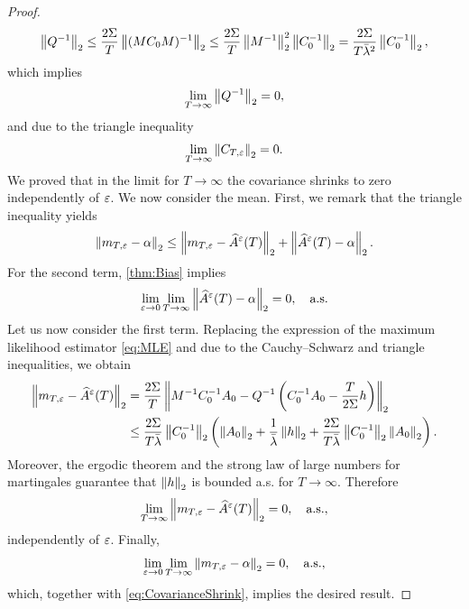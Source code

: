 \documentclass[review,onefignum,onetabnum]{siamonline190516}
\begin{document}
\begin{proof}
\begin{equation}
		\left\|Q^{-1}\right\|_2 \leq \frac{2\Sigma}T \left\|(MC_0M)^{-1}\right\|_2 \leq \frac{2\Sigma}T \left\|M^{-1}\right\|_2^2 \left\|C_0^{-1}\right\|_2 = \frac{2\Sigma}{T\bar \lambda^2} \left\|C_0^{-1}\right\|_2,
	\end{equation}
	which implies
	\begin{equation}
		\lim_{T \to \infty}\left\|Q^{-1}\right\|_2 = 0,
	\end{equation}
	and due to the triangle inequality
	\begin{equation}\label{eq:CovarianceShrink}
		\lim_{T \to \infty}\norm{C_{T,\epl}}_2 = 0.
	\end{equation}
	We proved that in the limit for $T \to \infty$ the covariance shrinks to zero independently of $\varepsilon$. We now consider the mean. First, we remark that the triangle inequality yields
	\begin{equation}
		\left\|m_{T,\varepsilon} - \alpha\right\|_2 \leq \left\|m_{T,\varepsilon} - \widehat A^\varepsilon(T)\right\|_2 + \left\|\widehat A^\varepsilon(T) - \alpha\right\|_2.
	\end{equation}
	For the second term, \cref{thm:Bias} implies 
	\begin{equation}
		\lim_{\varepsilon \to 0} \lim_{T \to \infty}\left\|\widehat A^\varepsilon(T) - \alpha\right\|_2 = 0, \quad \text{a.s.}
	\end{equation}
	Let us now consider the first term.	Replacing the expression of the maximum likelihood estimator \eqref{eq:MLE} and due to the Cauchy--Schwarz and triangle inequalities, we obtain
	\begin{equation}
	\begin{aligned}
		\left\|m_{T,\varepsilon} - \widehat A^\varepsilon(T)\right\|_2 &= \frac{2\Sigma}T\left\|M^{-1}C_0^{-1}A_0 - Q^{-1}\left(C_0^{-1}A_0 - \frac{T}{2\Sigma} h \right)\right\|_2\\
		&\leq \frac{2\Sigma}{T\bar \lambda} \left\|C_0^{-1}\right\|_2 \left(\left\|A_0\right\|_2 + \frac1{\bar \lambda}\left\|h\right\|_2 + \frac{2\Sigma}{T\bar \lambda} \left\|C_0^{-1}\right\|_2\left\|A_0\right\|_2\right).
	\end{aligned}
	\end{equation}
	Moreover, the ergodic theorem and the strong law of large numbers for martingales guarantee that $\left\|h\right\|_2$ is bounded a.s. for $T \to \infty$. Therefore
	\begin{equation}
	\lim_{T\to\infty} \left\|m_{T,\varepsilon} - \widehat A^\varepsilon(T)\right\|_2 = 0, \quad \text{a.s.},
	\end{equation}
	independently of $\varepsilon$. Finally, 
	\begin{equation}
		\lim_{\varepsilon \to 0} \lim_{T \to \infty}\left\|m_{T,\varepsilon} - \alpha\right\|_2 = 0, \quad \text{a.s.},
	\end{equation}
	which, together with \eqref{eq:CovarianceShrink}, implies the desired result. 
\end{proof}
\end{document}
